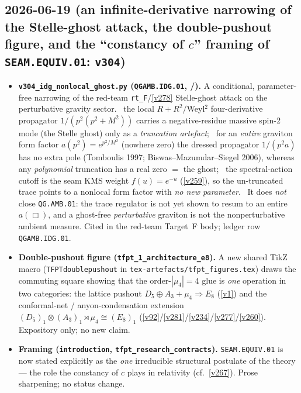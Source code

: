 \subsection*{2026-06-19 (an infinite-derivative narrowing of the Stelle-ghost attack, the double-pushout figure, and the ``constancy of $c$'' framing of \texttt{SEAM.EQUIV.01}: \texttt{v304})}
\begin{itemize}
\item \textbf{\texttt{v304\_idg\_nonlocal\_ghost.py} (\texttt{QGAMB.IDG.01}, \mC/\mO).} A conditional,
  parameter-free narrowing of the red-team \texttt{rt\_F}/\vref{v278} Stelle-ghost attack on the perturbative
  gravity sector. \mE\ the local $R{+}R^2/$Weyl$^2$ four-derivative propagator $1/(p^2(p^2{+}M^2))$ carries a
  negative-residue massive spin-2 mode (the Stelle ghost) only as a \emph{truncation artefact}; \mE\ for an
  \emph{entire} graviton form factor $a(p^2)=e^{p^2/M^2}$ (nowhere zero) the dressed propagator $1/(p^2a)$ has no
  extra pole (Tomboulis 1997; Biswas--Mazumdar--Siegel 2006), whereas any \emph{polynomial} truncation has a real
  zero $=$ the ghost; \mC\ the spectral-action cutoff is the seam KMS weight $f(u)=e^{-u}$ (\vref{v259}), so the
  un-truncated trace points to a nonlocal form factor with \emph{no new parameter}. \mO\ It does \emph{not} close
  \texttt{QG.AMB.01}: the trace regulator is not yet shown to resum to an entire $a(\Box)$, and a ghost-free
  \emph{perturbative} graviton is not the nonperturbative ambient measure. Cited in the red-team Target~F body;
  ledger row \texttt{QGAMB.IDG.01}.
\item \textbf{Double-pushout figure (\texttt{tfpt\_1\_architecture\_e8}).} A new shared TikZ macro
  (\texttt{TFPTdoublepushout} in \texttt{tex-artefacts/tfpt\_figures.tex}) draws the commuting square showing that
  the order-$|\mu_4|{=}4$ glue is \emph{one} operation in two categories: the lattice pushout
  $D_5\oplus A_3+\mu_4\Rightarrow E_8$ (\vref{v1}) and the conformal-net / anyon-condensation extension
  $(D_5)_1\otimes(A_3)_1\rtimes\mu_4\cong(E_8)_1$ (\vref{v92}/\vref{v281}/\vref{v234}/\vref{v277}/\vref{v260}).
  Expository only; no new claim.
\item \textbf{Framing (\texttt{introduction}, \texttt{tfpt\_research\_contracts}).} \texttt{SEAM.EQUIV.01} is now
  stated explicitly as the \emph{one} irreducible structural postulate of the theory --- the role the constancy of
  $c$ plays in relativity (cf.\ \vref{v267}). Prose sharpening; no status change.
\end{itemize}

